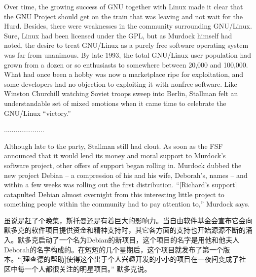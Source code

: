 \ifdefined\eng
Over time, the growing success of GNU together with Linux made it clear that the GNU Project should get on the train that was leaving and not wait for the Hurd. Besides, there were weaknesses in the community surrounding GNU/Linux. Sure, Linux had been licensed under the GPL, but as Murdock himself had noted, the desire to treat GNU/Linux as a purely free software operating system was far from unanimous. By late 1993, the total GNU/Linux user population had grown from a dozen or so enthusiasts to somewhere between 20,000 and 100,000. What had once been a hobby was now a marketplace ripe for exploitation, and some developers had no objection to exploiting it with nonfree software. Like Winston Churchill watching Soviet troops sweep into Berlin, Stallman felt an understandable set of mixed emotions when it came time to celebrate the GNU/Linux ``victory.''
\fi

\ifdefined\chs
.....................
\fi

\ifdefined\eng
Although late to the party, Stallman still had clout. As soon as the FSF announced that it would lend its money and moral support to Murdock's software project, other offers of support began rolling in. Murdock dubbed the new project Debian -- a compression of his and his wife, Deborah's, names -- and within a few weeks was rolling out the first distribution. ``[Richard's support] catapulted Debian almost overnight from this interesting little project to something people within the community had to pay attention to,'' Murdock says.
\fi

\ifdefined\chs
虽说是赶了个晚集，斯托曼还是有着巨大的影响力。当自由软件基金会宣布它会向默多克的软件项目提供资金和精神支持时，其它各方面的支持也开始源源不断的涌入。默多克启动了一个名为Debian的新项目，这个项目的名字是用他和他夫人Deborah的名字构成的。在短短的几个星期后，这个项目就发布了第一个版本。``[理查德的帮助]使得这个出于个人兴趣开发的小小的项目在一夜间变成了社区中每一个人都很关注的明星项目。'' 默多克说。
\fi

